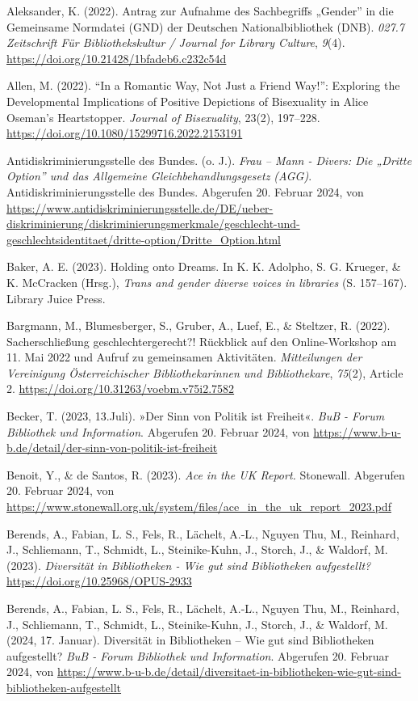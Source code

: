 \documentclass[a4paper,
fontsize=11pt,
oneside,
numbers=noperiodatend,
parskip=half-,
bibliography=totoc,
final
]{scrartcl}
\begin{document}
Aleksander, K. (2022). Antrag zur Aufnahme des Sachbegriffs „Gender'' in
die Gemeinsame Normdatei (GND) der Deutschen Nationalbibliothek (DNB).
\emph{027.7 Zeitschrift Für Bibliothekskultur / Journal for Library
Culture}, \emph{9}(4). \url{https://doi.org/10.21428/1bfadeb6.c232c54d}

Allen, M. (2022). \enquote{In a Romantic Way, Not Just a Friend Way!}:
Exploring the Developmental Implications of Positive Depictions of
Bisexuality in Alice Oseman's Heartstopper. \emph{Journal of
Bisexuality}, 23(2), 197--228.
\url{https://doi.org/10.1080/15299716.2022.2153191}

Antidiskriminierungsstelle des Bundes. (o. J.). \emph{Frau -- Mann -
Divers: Die „Dritte Option'' und das Allgemeine Gleichbehandlungsgesetz
(AGG)}. Antidiskriminierungsstelle des Bundes. Abgerufen 20. Februar
2024, von
\url{https://www.antidiskriminierungsstelle.de/DE/ueber-diskriminierung/diskriminierungsmerkmale/geschlecht-und-geschlechtsidentitaet/dritte-option/Dritte_Option.html}

Baker, A. E. (2023). Holding onto Dreams. In K. K. Adolpho, S. G.
Krueger, \& K. McCracken (Hrsg.), \emph{Trans and gender diverse voices
in libraries} (S. 157--167). Library Juice Press.

Bargmann, M., Blumesberger, S., Gruber, A., Luef, E., \& Steltzer, R.
(2022). Sacherschließung geschlechtergerecht?! Rückblick auf den
Online-Workshop am 11. Mai 2022 und Aufruf zu gemeinsamen Aktivitäten.
\emph{Mitteilungen der Vereinigung Österreichischer Bibliothekarinnen
und Bibliothekare}, \emph{75}(2), Article 2.
\url{https://doi.org/10.31263/voebm.v75i2.7582}

Becker, T. (2023, 13.Juli). »Der Sinn von Politik ist Freiheit«.
\emph{BuB - Forum Bibliothek und Information}. Abgerufen 20. Februar
2024, von
\url{https://www.b-u-b.de/detail/der-sinn-von-politik-ist-freiheit}

Benoit, Y., \& de Santos, R. (2023). \emph{Ace in the UK Report.}
Stonewall. Abgerufen 20. Februar 2024, von
\url{https://www.stonewall.org.uk/system/files/ace_in_the_uk_report_2023.pdf}

Berends, A., Fabian, L. S., Fels, R., Lächelt, A.-L., Nguyen Thu, M.,
Reinhard, J., Schliemann, T., Schmidt, L., Steinike-Kuhn, J., Storch,
J., \& Waldorf, M. (2023). \emph{Diversität in Bibliotheken - Wie gut
sind Bibliotheken aufgestellt?} \url{https://doi.org/10.25968/OPUS-2933}

Berends, A., Fabian, L. S., Fels, R., Lächelt, A.-L., Nguyen Thu, M.,
Reinhard, J., Schliemann, T., Schmidt, L., Steinike-Kuhn, J., Storch,
J., \& Waldorf, M. (2024, 17. Januar). Diversität in Bibliotheken -- Wie
gut sind Bibliotheken aufgestellt? \emph{BuB - Forum Bibliothek und
Information}. Abgerufen 20. Februar 2024, von
\url{https://www.b-u-b.de/detail/diversitaet-in-bibliotheken-wie-gut-sind-bibliotheken-aufgestellt}
\end{document}
